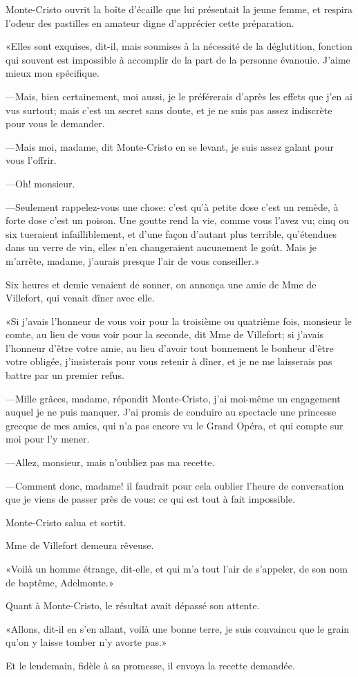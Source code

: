 Monte-Cristo ouvrit la boîte d'écaille que lui présentait la jeune femme, et respira l'odeur des pastilles en amateur digne d'apprécier cette préparation. 

«Elles sont exquises, dit-il, mais soumises à la nécessité de la déglutition, fonction qui souvent est impossible à accomplir de la part de la personne évanouie. J'aime mieux mon spécifique. 

—Mais, bien certainement, moi aussi, je le préférerais d'après les effets que j'en ai vus surtout; mais c'est un secret sans doute, et je ne suis pas assez indiscrète pour vous le demander. 

—Mais moi, madame, dit Monte-Cristo en se levant, je suis assez galant pour vous l'offrir. 

—Oh! monsieur. 

—Seulement rappelez-vous une chose: c'est qu'à petite dose c'est un remède, à forte dose c'est un poison. Une goutte rend la vie, comme vous l'avez vu; cinq ou six tueraient infailliblement, et d'une façon d'autant plus terrible, qu'étendues dans un verre de vin, elles n'en changeraient aucunement le goût. Mais je m'arrête, madame, j'aurais presque l'air de vous conseiller.» 

Six heures et demie venaient de sonner, on annonça une amie de Mme de Villefort, qui venait dîner avec elle. 

«Si j'avais l'honneur de vous voir pour la troisième ou quatrième fois, monsieur le comte, au lieu de vous voir pour la seconde, dit Mme de Villefort; si j'avais l'honneur d'être votre amie, au lieu d'avoir tout bonnement le bonheur d'être votre obligée, j'insisterais pour vous retenir à dîner, et je ne me laisserais pas battre par un premier refus. 

—Mille grâces, madame, répondit Monte-Cristo, j'ai moi-même un engagement auquel je ne puis manquer. J'ai promis de conduire au spectacle une princesse grecque de mes amies, qui n'a pas encore vu le Grand Opéra, et qui compte sur moi pour l'y mener. 

—Allez, monsieur, mais n'oubliez pas ma recette. 

—Comment donc, madame! il faudrait pour cela oublier l'heure de conversation que je viens de passer près de vous: ce qui est tout à fait impossible. 

Monte-Cristo salua et sortit. 

Mme de Villefort demeura rêveuse. 

«Voilà un homme étrange, dit-elle, et qui m'a tout l'air de s'appeler, de son nom de baptême, Adelmonte.» 

Quant à Monte-Cristo, le résultat avait dépassé son attente. 

«Allons, dit-il en s'en allant, voilà une bonne terre, je suis convaincu que le grain qu'on y laisse tomber n'y avorte pas.» 

Et le lendemain, fidèle à sa promesse, il envoya la recette demandée. 